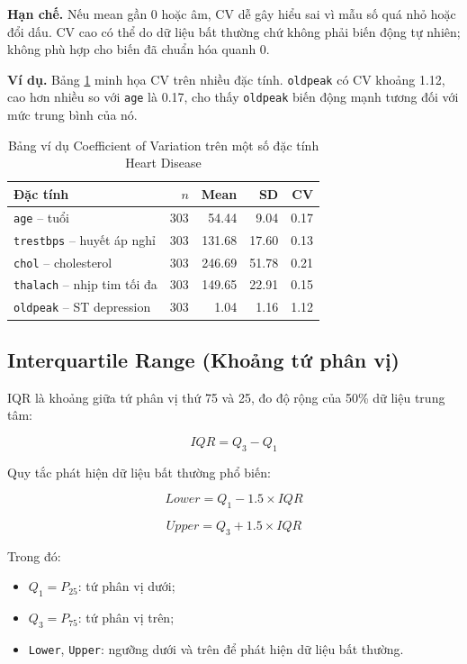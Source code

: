 \textbf{Hạn chế.} Nếu mean gần 0 hoặc âm, CV dễ gây hiểu sai vì mẫu số quá nhỏ hoặc đổi dấu. CV cao có thể do dữ liệu bất thường chứ không phải biến động tự nhiên; không phù hợp cho biến đã chuẩn hóa quanh 0.

\textbf{Ví dụ.} Bảng \ref{tab:chapter1_cv_example} minh họa CV trên nhiều đặc tính. \texttt{oldpeak} có CV khoảng 1.12, cao hơn nhiều so với \texttt{age} là 0.17, cho thấy \texttt{oldpeak} biến động mạnh tương đối với mức trung bình của nó.

\begin{table}[H]
\centering
\caption{Bảng ví dụ Coefficient of Variation trên một số đặc tính Heart Disease}
\label{tab:chapter1_cv_example}
\small
\begin{tabular}{lrrrr}
\toprule
Đặc tính & $n$ & Mean & SD & CV \\
\midrule
\texttt{age} -- tuổi & 303 & 54.44 & 9.04 & 0.17 \\
\texttt{trestbps} -- huyết áp nghỉ & 303 & 131.68 & 17.60 & 0.13 \\
\texttt{chol} -- cholesterol & 303 & 246.69 & 51.78 & 0.21 \\
\texttt{thalach} -- nhịp tim tối đa & 303 & 149.65 & 22.91 & 0.15 \\
\texttt{oldpeak} -- ST depression & 303 & 1.04 & 1.16 & 1.12 \\
\bottomrule
\end{tabular}
\end{table}

\subsection{Interquartile Range (Khoảng tứ phân vị)}

IQR là khoảng giữa tứ phân vị thứ 75 và 25, đo độ rộng của 50\% dữ liệu trung tâm:

\begin{equation}
IQR = Q_3 - Q_1
\end{equation}

Quy tắc phát hiện dữ liệu bất thường phổ biến:

\begin{equation}
Lower = Q_1 - 1.5 \times IQR
\end{equation}

\begin{equation}
Upper = Q_3 + 1.5 \times IQR
\end{equation}

Trong đó:
\begin{itemize}[leftmargin=1.6em,label=\textbullet]
 \item $Q_1=P_{25}$: tứ phân vị dưới;
 \item $Q_3=P_{75}$: tứ phân vị trên;
 \item \texttt{Lower}, \texttt{Upper}: ngưỡng dưới và trên để phát hiện dữ liệu bất thường.
\end{itemize}


